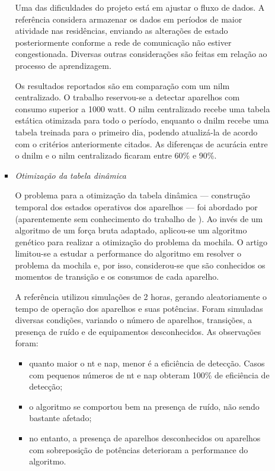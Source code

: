 \begin{enumerate}[label=\textbf{1.\arabic*},wide=\parindent]
\begin{enumerate}[label*=.\textbf{\arabic*},wide=\parindent]
\begin{itemize}[wide=\parindent]
Uma das dificuldades do projeto está em ajustar o fluxo de dados. A
referência considera armazenar os dados em períodos de maior atividade
nas residências, enviando as alterações de estado posteriormente
conforme a rede de comunicação não estiver congestionada. Diversas
outras considerações são feitas em relação ao processo de
aprendizagem.

Os resultados reportados são em comparação com um \gls{nilm}
centralizado. O trabalho reservou-se a detectar aparelhos com consumo
superior a 1000 \acrshort{watt}. O \gls{nilm} centralizado recebe uma
tabela estática otimizada para todo o período, enquanto o \gls{dnilm}
recebe uma tabela treinada para o primeiro dia, podendo atualizá-la de
acordo com o critérios anteriormente citados. As diferenças de
acurácia entre o \gls{dnilm} e o \gls{nilm} centralizado ficaram entre
60\% e 90\%.

\item \emph{Otimização da tabela dinâmica}

O problema para a otimização da tabela dinâmica --- construção
temporal dos estados operativos dos aparelhos --- foi abordado por
\citet*{nilm_genetic_2013} (aparentemente sem conhecimento do trabalho
de \citeauthor{nilm_bergman_distribuido_2011}). Ao invés de um
algoritmo de um força bruta adaptado, aplicou-se um algoritmo genético
para realizar a otimização do problema da mochila. O artigo limitou-se
a estudar a performance do algoritmo em resolver o problema da mochila
e, por isso, considerou-se que são conhecidos os momentos de transição
e os consumos de cada aparelho.

A referência utilizou simulações de 2 horas, gerando aleatoriamente o
tempo de operação dos aparelhos e suas potências. Foram simuladas
diversas condições, variando o número de aparelhos, transições, a
presença de ruído e de equipamentos desconhecidos. As observações
foram: 

\begin{itemize}
\item quanto maior o \gls{nt} e \gls{nap}, menor é a eficiência de
detecção. Casos com pequenos números de \gls{nt} e \gls{nap} obteram
100\% de eficiência de detecção;
\item o algoritmo se comportou bem na presença de ruído, não sendo
bastante afetado;
\item no entanto, a presença de aparelhos desconhecidos ou aparelhos
com sobreposição de potências deterioram a performance do algoritmo.
\end{itemize}

\end{itemize}

\end{enumerate}

\end{enumerate}

